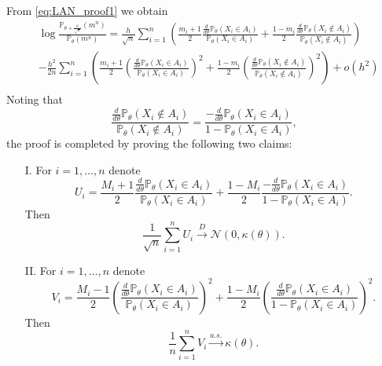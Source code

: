 \documentclass[letterpaper, 11pt]{IEEEtran}      %
\newcommand{\Prob}{\mathbb{P} }
\begin{document}
From \eqref{eq:LAN_proof1} we obtain
\begin{align*}
& \log \frac{ \Prob_{\theta + \frac{h}{\sqrt{n}}}(m^n)} { \Prob_\theta (m^n) }   = \frac{h}{\sqrt{n}} \sum_{i=1}^n  
\left( 
\frac{m_i+1}{2}  \frac{\frac{d}{d\theta} \Prob_{\theta}(X_i \in A_i)}{\Prob_{\theta}(X_i \in A_i)}  + 
 \frac{1-m_i}{2}  \frac{\frac{d}{d\theta} \Prob_{\theta}(X_i \notin A_i)}{\Prob_{\theta}(X_i \notin A_i)}   \right) \\
 & - \frac{h^2}{2n} 
 \sum_{i=1}^n 
\left( 
 \frac{m_i+1}{2} 
\left( \frac{\frac{d}{d\theta} \Prob_{\theta}(X_i \in A_i)}{\Prob_{\theta}(X_i \in A_i)}  \right)^2
+ 
 \frac{1-m_i}{2} \left( \frac{\frac{d}{d\theta} \Prob_{\theta}(X_i \notin A_i)}{\Prob_{\theta}(X_i \notin A_i)}  \right)^2 \right) + o(h^2) \\
\end{align*}
%
Noting that 
\[
\frac{\frac{d}{d\theta} \Prob_{\theta}(X_i \notin A_i)}{\Prob_{\theta}(X_i \notin A_i)} = \frac{-\frac{d}{d\theta} \Prob_{\theta}(X_i \in A_i)}{1-\Prob_{\theta}(X_i \in A_i)},
\]
the proof is completed by proving the following two claims:
\begin{itemize}
\item[I.] 
For $i=1,\ldots,n$ denote 
\[
U_i = \frac{M_i+1}{2}  \frac{\frac{d}{d\theta} \Prob_{\theta}(X_i \in A_i)}{\Prob_{\theta}(X_i \in A_i)}  + 
 \frac{1-M_i}{2}  \frac{-\frac{d}{d\theta} \Prob_{\theta}(X_i \in A_i)}{1-\Prob_{\theta}(X_i \in A_i)}. 
\]
Then 
\[
\frac{1}{\sqrt{n}} \sum_{i=1}^n U_i \overset{D}{\rightarrow} \mathcal N\left(0, \kappa(\theta) \right). 
\]
\item[II.]
For $i=1,\ldots,n$ denote 
\[
V_i =  \frac{M_i-1}{2} 
\left( \frac{\frac{d}{d\theta} \Prob_{\theta}(X_i \in A_i)}{\Prob_{\theta}(X_i \in A_i)}  \right)^2
+ 
 \frac{1-M_i}{2} \left( \frac{\frac{d}{d\theta} \Prob_{\theta}(X_i \in A_i)}{1-\Prob_{\theta}(X_i \in A_i)}  \right)^2.
\]
Then 
\[
\frac{1}{n} \sum_{i=1}^n V_i \overset{a.s.}{\rightarrow} \kappa(\theta). 
\]
\end{itemize}
\end{document}
